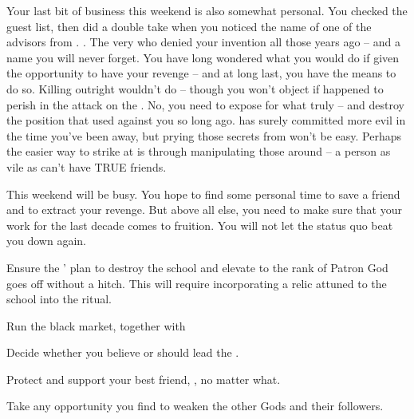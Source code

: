 \documentclass[char]{GL2020}
\begin{document}
Your last bit of business this weekend is also somewhat personal. You checked the guest list, then did a double take when you noticed the name of one of the advisors from \pTech{}. \cAntiChup{}. The very \cAntiChup{\cleric} who denied your invention all those years ago -- and a name you will never forget. You have long wondered what you would do if given the opportunity to have your revenge -- and at long last, you have the means to do so. Killing \cAntiChup{} outright wouldn’t do -- though you won’t object if \cAntiChup{\they} happened to perish in the attack on the \pSc{}. No, you need to expose \cAntiChup{\them} for what \cAntiChup{\they} truly \cAntiChup{\are} -- and destroy the position that \cAntiChup{\they} used against you so long ago. \cAntiChup{} has surely committed more evil in the time you’ve been away, but prying those secrets from \cAntiChup{\them} won’t be easy. Perhaps the easier way to strike at \cAntiChup{\them} is through manipulating those around \cAntiChup{\them} -- a person as vile as \cAntiChup{} can’t have TRUE friends.

This weekend will be busy. You hope to find some personal time to save a friend and to extract your revenge. But above all else, you need to make sure that your work for the last decade comes to fruition. You will not let the status quo beat you down again. 

\begin{itemz}[Goals]
	\item Ensure the \pGoaties{}’ plan to destroy the school and elevate \cGenesis{} to the rank of Patron God goes off without a hitch. This will require incorporating a relic attuned to the school into the ritual.
	\item Run the black market, together with \cChupSecond{}
	\item Decide whether you believe \cChupLeader{} or \cChupSecond{} should lead the \pGoaties{}.
	\item Protect and support your best friend, \cHeadScientist{}, no matter what.
	\item Take any opportunity you find to weaken the other Gods and their followers.
\end{itemz}

\begin{itemz}[Notes]
	\item
\end{itemz}
\end{document}
